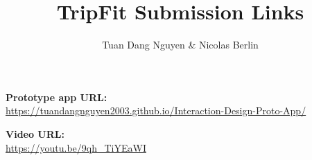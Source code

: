 \documentclass[11pt,a4paper]{article}
\title{TripFit Submission Links}
\author{Tuan Dang Nguyen \& Nicolas Berlin}
\date{}
\begin{document}
\maketitle

\textbf{Prototype app URL:}\\
\url{https://tuandangnguyen2003.github.io/Interaction-Design-Proto-App/}

\textbf{Video URL:}\\
\url{https://youtu.be/9qh_TiYEaWI}
\end{document}
